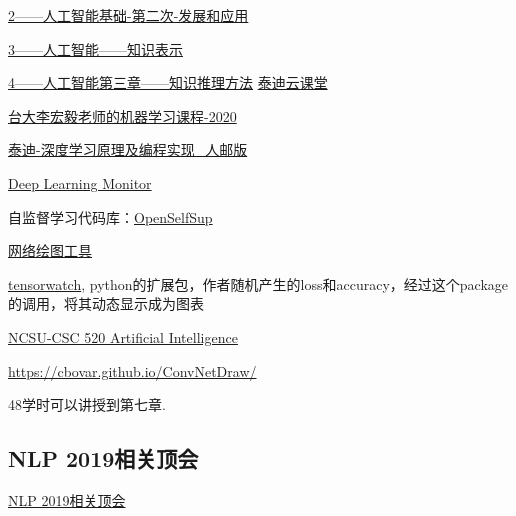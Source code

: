 \begin{pre}
\href{https://ke.qq.com/webcourse/index.html?cid=1086628&term_id=101182654&lite=1&from=800021724#taid=8423279&vid=5285890799803709554}{2——人工智能基础-第二次-发展和应用}

\href{https://github.com/zggl/AITeachingPlanDraft2020/blob/master/3-\%E4\%BA\%BA\%E5\%B7\%A5\%E6\%99\%BA\%E8\%83\%BD\%E7\%AC\%AC\%E4\%BA\%8C\%E7\%AB\%A0\%E7\%AC\%AC\%E4\%B8\%80\%E6\%AC\%A1\%E5\%B9\%BB\%E7\%81\%AF\%20\%E4\%BA\%BA\%E5\%B7\%A5\%E6\%99\%BA\%E8\%83\%BD\%E7\%9A\%84\%E7\%9F\%A5\%E8\%AF\%86\%E8\%A1\%A8\%E7\%A4\%BA.pdf}{3——人工智能——知识表示}

\href{https://github.com/zggl/AITeachingPlanDraft2020/blob/master/4-\%E4\%BA\%BA\%E5\%B7\%A5\%E6\%99\%BA\%E8\%83\%BD\%E7\%AC\%AC\%E4\%B8\%89\%E7\%AB\%A0\%E7\%AC\%AC\%E4\%B8\%80\%E6\%AC\%A1\%20\%E4\%BA\%BA\%E5\%B7\%A5\%E6\%99\%BA\%E8\%83\%BD\%E7\%9A\%84\%E7\%9F\%A5\%E8\%AF\%86\%E6\%8E\%A8\%E7\%90\%86\%E6\%96\%B9\%E6\%B3\%95.pdf}{4——人工智能第三章——知识推理方法}
\href{https://edu.tipdm.org/notification?id=32302}{泰迪云课堂}

\href{http://speech.ee.ntu.edu.tw/~tlkagk/courses_ML20.html}{台大李宏毅老师的机器学习课程-2020}

\href{https://edu.tipdm.org/classroom/122/courses}{泰迪-深度学习原理及编程实现\_人邮版}

\href{https://deeplearn.org/}{Deep Learning Monitor}

自监督学习代码库：\href{https://github.com/open-mmlab/OpenSelfSup}{OpenSelfSup}

\href{http://alexlenail.me/NN-SVG/}{网络绘图工具}

\href{https://github.com/microsoft/tensorwatch}{tensorwatch}, python的扩展包，作者随机产生的loss和accuracy，经过这个package的调用，将其动态显示成为图表

\href{https://www.engineeringonline.ncsu.edu/course/csc-520-artificial-intelligence-i/}{NCSU-CSC 520 Artificial Intelligence}

\href{ConvNetDraw（卷积神经网络）,配置命令的CNN神经网络画图工具，开发者是香港的一位程序员。}{https://cbovar.github.io/ConvNetDraw/}

48学时可以讲授到第七章.
\subsection{NLP 2019相关顶会}
\href{https://github.com/zggl/NLP-Conferences-Code}{NLP 2019相关顶会}


\end{pre}
